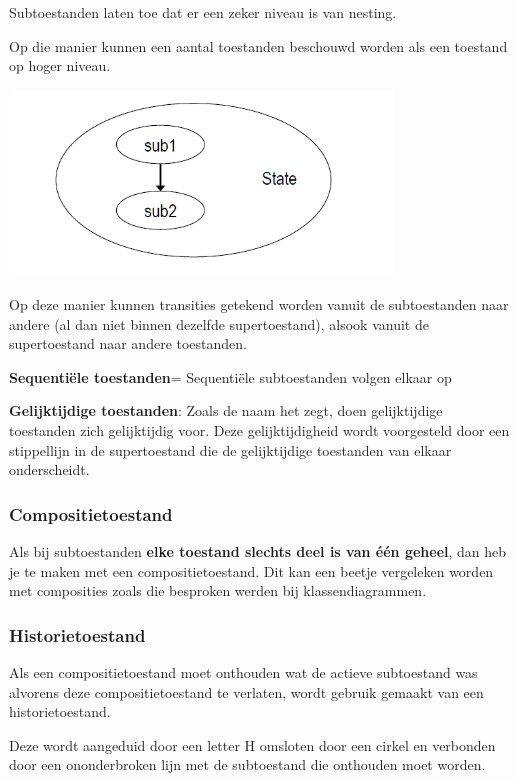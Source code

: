 Subtoestanden laten toe dat er een zeker niveau is van nesting. 

Op die manier kunnen een aantal toestanden beschouwd worden als een toestand op hoger niveau.


\begin{center}
\includegraphics[width=4in]{img/substate}%
\end{center}

Op deze manier kunnen transities getekend worden vanuit de subtoestanden naar andere (al dan niet binnen dezelfde supertoestand), alsook vanuit de supertoestand naar andere toestanden.

\textbf{Sequentiële toestanden}= Sequentiële subtoestanden volgen elkaar op

\textbf{Gelijktijdige toestanden}: 
Zoals de naam het zegt, doen gelijktijdige toestanden zich gelijktijdig voor. Deze gelijktijdigheid wordt voorgesteld door een stippellijn in de supertoestand die de gelijktijdige toestanden van elkaar onderscheidt.

\subsubsection{Compositietoestand}

Als bij subtoestanden \textbf{elke toestand slechts deel is van één geheel}, dan heb je te maken met een compositietoestand. Dit kan een beetje vergeleken worden met composities zoals die besproken werden bij klassendiagrammen.

\subsubsection{Historietoestand}

Als een compositietoestand moet onthouden wat de actieve subtoestand was alvorens deze compositietoestand te verlaten, wordt gebruik gemaakt van een historietoestand.

Deze wordt aangeduid door een letter H omsloten door een cirkel en verbonden door een ononderbroken lijn met de subtoestand die onthouden moet worden.


